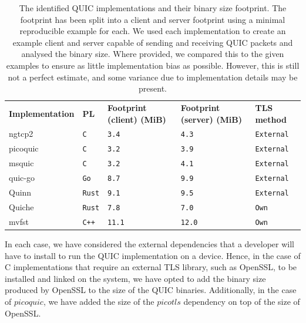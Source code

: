 \begin{table}[ht]
    \caption{The identified QUIC implementations and their binary size footprint. The footprint has been split into a client and server footprint using a minimal reproducible example for each. We used each implementation to create an example client and server capable of sending and receiving QUIC packets and analysed the binary size. Where provided, we compared this to the given examples to ensure as little implementation bias as possible. However, this is still not a perfect estimate, and some variance due to implementation details may be present.}\label{tab:quics}
    \begin{tabular}{@{}lllll@{}}
        \toprule
        \textbf{Implementation} & \textbf{PL}   & \textbf{Footprint (client) (MiB)} & \textbf{Footprint (server) (MiB)} & \textbf{TLS method} \\
        ngtcp2                  & \texttt{C}    & \texttt{3.4}                      & \texttt{4.3}                      & \texttt{External}   \\
        picoquic                & \texttt{C}    & \texttt{3.2}                      & \texttt{3.9}                      & \texttt{External}   \\
        msquic                  & \texttt{C}    & \texttt{3.2}                      & \texttt{4.1}                      & \texttt{External}   \\
        quic-go                 & \texttt{Go}   & \texttt{8.7}                      & \texttt{9.9}                      & \texttt{External}   \\
        Quinn                   & \texttt{Rust} & \texttt{9.1}                      & \texttt{9.5}                      & \texttt{External}   \\
        Quiche                  & \texttt{Rust} & \texttt{7.8}                      & \texttt{7.0}                      & \texttt{Own}        \\
        mvfst                   & \texttt{C++}  & \texttt{11.1}                     & \texttt{12.0}                     & \texttt{Own}        \\
        \bottomrule
    \end{tabular}
\end{table}

In each case, we have considered the external dependencies that a developer will have to install to run the QUIC implementation on a device.
Hence, in the case of C implementations that require an external TLS library, such as OpenSSL, to be installed and linked on the system, we have opted to add the binary size produced by OpenSSL to the size of the QUIC binaries.
Additionally, in the case of $picoquic$, we have added the size of the $picotls$ dependency on top of the size of OpenSSL.

